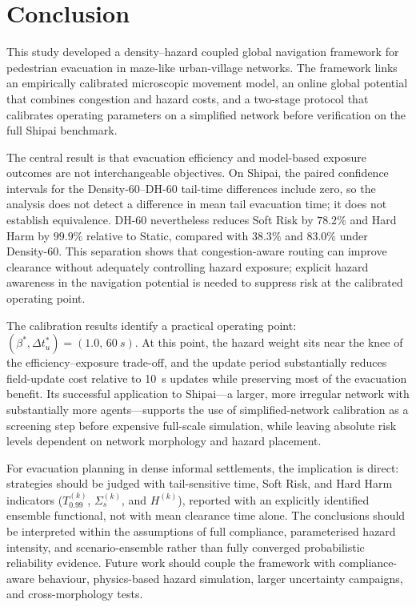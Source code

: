 \documentclass[preprint,12pt]{elsarticle}
\providecommand{\FloatBarrier}{}
\let\origsection\section
\renewcommand{\section}{\FloatBarrier\origsection}
\begin{document}
\section{Conclusion}
\label{sec:conclusion}

This study developed a density--hazard coupled global navigation
framework for pedestrian evacuation in maze-like urban-village
networks. The framework links an empirically calibrated microscopic
movement model, an online global potential that combines congestion and
hazard costs, and a two-stage protocol that calibrates operating
parameters on a simplified network before verification on the full
Shipai benchmark.

The central result is that evacuation efficiency and model-based exposure outcomes are
not interchangeable objectives. On Shipai, the paired confidence
intervals for the Density-60--DH-60 tail-time differences include zero,
so the analysis does not detect a difference in mean tail evacuation
time; it does not establish equivalence. DH-60 nevertheless reduces
Soft Risk by $78.2\%$ and Hard Harm by $99.9\%$ relative to
Static, compared with $38.3\%$ and $83.0\%$ under Density-60. This
separation shows that congestion-aware routing can improve clearance
without adequately controlling hazard exposure; explicit hazard
awareness in the navigation potential is needed to suppress risk at the
calibrated operating point.

The calibration results identify a practical operating point:
$(\beta^{*}, \Delta t_u^{*}) = (1.0,\,\SI{60}{s})$. At this point,
the hazard weight sits near the knee of the efficiency--exposure
trade-off, and the update period substantially reduces field-update cost
relative to \SI{10}{s} updates while preserving most of the
evacuation benefit. Its successful application to Shipai---a larger,
more irregular network with substantially more agents---supports the use
of simplified-network calibration as a screening step before expensive
full-scale simulation, while leaving absolute risk levels dependent on
network morphology and hazard placement.

For evacuation planning in dense informal settlements, the implication
is direct: strategies should be judged with tail-sensitive time,
Soft Risk, and Hard Harm indicators
($T_{0.99}^{(k)}$, $\Sigma_s^{(k)}$, and $H^{(k)}$),
reported with an explicitly identified ensemble functional, not with mean
clearance time alone. The conclusions should be
interpreted within the assumptions of full compliance, parameterised
hazard intensity, and scenario-ensemble rather than fully converged
probabilistic reliability evidence. Future work should couple the
framework with compliance-aware behaviour, physics-based hazard
simulation, larger uncertainty campaigns, and cross-morphology tests.
\end{document}
